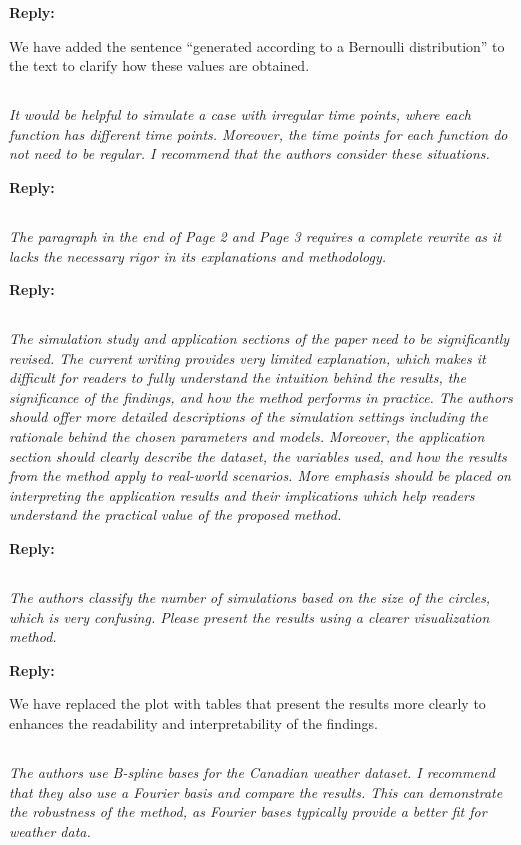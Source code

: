 \documentclass[12pt,a4paper]{article}
\newcommand{\comments}[1]{\subsection{}
\begin{mdframed}[style=comments] 
        \textit{#1}
\end{mdframed}}
\newcommand{\reply}[1]{
    \noindent\textbf{Reply:}

\begin{mdframed}[style=replies] 
    #1
\end{mdframed}
}
\begin{document}
\reply{We have added the sentence ``generated according to a Bernoulli distribution'' to the text to clarify how these values are obtained.}


\comments{It would be helpful to simulate a case with irregular time points, where each function has different time points. Moreover, the time points for each function do not need to be regular. I recommend that the authors consider these situations.}

\reply{}


\comments{The paragraph in the end of Page 2 and Page 3 requires a complete rewrite as it lacks the necessary rigor in its explanations and methodology.}

\reply{}


\comments{The simulation study and application sections of the paper need to be significantly revised. The current writing provides very limited explanation, which makes it difficult for readers to fully understand the intuition behind the results, the significance of the findings, and how the method performs in practice. The authors should offer more detailed descriptions of the simulation settings including the rationale behind the chosen parameters and models. Moreover, the application section should clearly describe the dataset, the variables used, and how the results from the method apply to real-world scenarios. More emphasis should be placed on interpreting the application results and their implications which help readers understand the practical value of the proposed method.}

\reply{}

\comments{The authors classify the number of simulations based on the size of the circles, which is very confusing. Please present the results using a clearer visualization method.}

\reply{We have replaced the plot with tables that present the results more clearly to enhances the readability and interpretability of the findings.}

\comments{The authors use B-spline bases for the Canadian weather dataset. I recommend that they also use a Fourier basis and compare the results. This can demonstrate the robustness of the method, as Fourier bases typically provide a better fit for weather data.}
\end{document}
